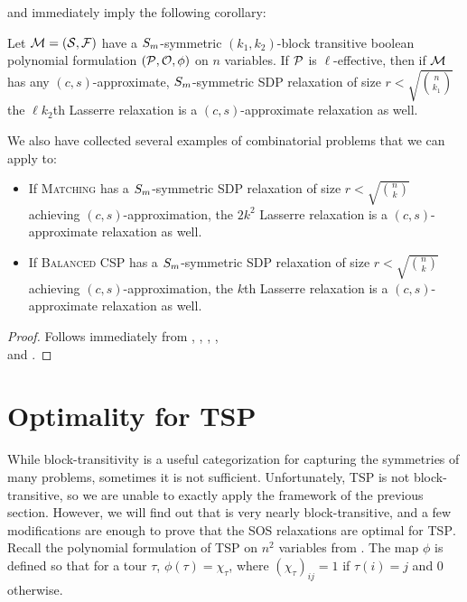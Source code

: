 and  immediately imply the following corollary:
\begin{corollary}\label{cor:lass-optimal}
Let $\mathcal M = (\mathcal S, \mathcal F)$ have a $S_{m}$-symmetric $(k_1,k_2)$-block transitive boolean polynomial formulation $(\mathcal P, \mathcal O, \phi)$ on $n$ variables. If $\mathcal P$ is $\ell$-effective, then if $\mathcal M$ has any $(c,s)$-approximate, $S_{m}$-symmetric SDP relaxation of size $r < \sqrt{\binom{n}{k_1}}$ the $\ell k_2$th Lasserre relaxation is a $(c,s)$-approximate relaxation as well.
\end{corollary}
We also have collected several examples of combinatorial problems that we can apply  to:
\begin{corollary}\label{cor:matching_bcsp_optimal}
\leavevmode
\begin{itemize}
\item If \textsc{Matching} has a $S_{m}$-symmetric SDP relaxation of size $r < \sqrt{\binom{n}{k}}$ achieving $(c,s)$-approximation, the $2k^2$ Lasserre relaxation is a $(c,s)$-approximate relaxation as well.
\item If \textsc{Balanced CSP} has a $S_{m}$-symmetric SDP relaxation of size $r < \sqrt{\binom{n}{k}}$ achieving $(c,s)$-approximation, the $k$th Lasserre relaxation is a $(c,s)$-approximate relaxation as well.
\end{itemize}
\end{corollary}
\begin{proof}
Follows immediately from , , , , \\  and .
\end{proof}

\section{Optimality for \textsc{TSP}}
While block-transitivity is a useful categorization for capturing the symmetries of many problems, sometimes it is not sufficient. Unfortunately, \textsc{TSP} is not block-transitive, so we are unable to exactly apply the framework of the previous section. However, we will find out that is very nearly block-transitive, and a few modifications are enough to prove that the SOS relaxations are optimal for \textsc{TSP}. 
Recall the polynomial formulation of \textsc{TSP} on $n^2$ variables from . The map $\phi$ is defined so that for a tour $\tau$, $\phi(\tau) = \chi_\tau$, where $(\chi_\tau)_{ij} = 1$ if $\tau(i) = j$ and $0$ otherwise.

